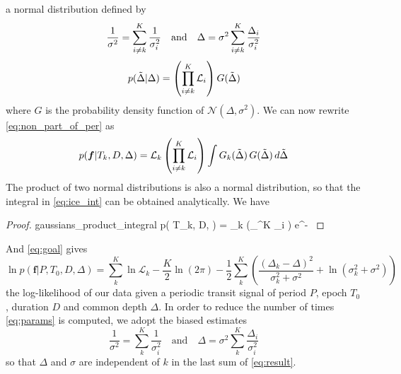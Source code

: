 \documentclass{aastex631}
\begin{document}
a normal distribution defined by
\begin{equation}\label{eq:params}
\frac{1}{\sigma^2} = \sum_{\sumTk}^K \frac{1}{\sigma_i^2} \quad \text{and} \quad
\Delta =\sigma^2 \sum_{\sumTk}^K {\frac{\Delta_i}{\sigma_i^2}}
\end{equation}
$$p(\tilde\Delta | \Delta) =  \left(\prod_{i\neq k}^K \mathcal{L}_i \right) G(\tilde\Delta)$$
where $G$ is the probability density function of $\mathcal{N}(\Delta, \sigma^2)$. We can now rewrite \autoref{eq:non_part_of_per} as
\begin{equation}\label{eq:ice_int}
    p(\bm{f} \vert T_k, D, \Delta) =   \mathcal{L}_k \left(\prod_{\sumTk}^K \mathcal{L}_i \right)  \int G_k(\tilde\Delta)\, G(\tilde\Delta)\, d\tilde\Delta
\end{equation}
The product of two normal distributions is also a normal distribution, so that the integral in \autoref{eq:ice_int} can be obtained analytically. We have
\begin{proof}{gaussians_product_integral}
    p( \vert T_k, D, \Delta) =   _k \left(\prod_{\sumTk}^K _i  \right)  e^{- }
\end{proof}
And \autoref{eq:goal} gives 
\begin{equation}\label{eq:result}
    \ln p(\bm{f} \vert P, T_0 ,D, \Delta) =  \sum_{k}^K \ln \mathcal{L}_k  - \frac{K}{2}\ln(2\pi) - \frac{1}{2}\sum_k^K \left( \frac{\left(\Delta_{k} -
    \Delta\right)^{2}}{\sigma_k^{2} + \sigma^{2}} + \ln{\left(\sigma_k^{2} + \sigma^{2} \right)} \right)
\end{equation}
the log-likelihood of our data given a periodic transit signal of period $P$, epoch $T_0$, duration $D$ and common depth $\Delta$. In order to reduce the number of times \autoref{eq:params} is computed, we adopt the biased estimates
$$\frac{1}{\sigma^2} = \sum_{k}^K \frac{1}{\sigma_i^2} \quad \text{and} \quad \Delta  = \sigma^2 \sum_{k}^K {\frac{\Delta_i}{\sigma_i^2}}$$
so that $\Delta$ and $\sigma$ are independent of $k$ in the last sum of \autoref{eq:result}.


\end{document}
